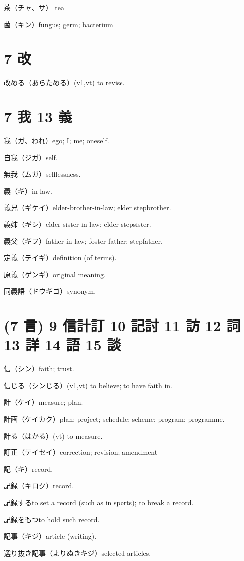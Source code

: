 茶（チャ、サ） tea

菌（キン）fungus; germ; bacterium

\section{7 改}

改める（あらためる）(v1,vt) to revise.

\section{7 我 13 義}

我（ガ、われ）ego; I; me; oneself.

自我（ジガ）self.

無我（ムガ）selflessness.

義（ギ）in-law.

義兄（ギケイ）elder-brother-in-law; elder stepbrother.

義姉（ギシ）elder-sister-in-law; elder stepsister.

義父（ギフ）father-in-law; foster father; stepfather.

定義（テイギ）definition (of terms).

原義（ゲンギ）original meaning.

同義語（ドウギゴ）synonym.

\section{(7 言) 9 信計訂 10 記討 11 訪 12 詞 13 詳 14 語 15 談}

信（シン）faith; trust.

信じる（シンじる）(v1,vt) to believe; to have faith in.

計（ケイ）measure; plan.

計画（ケイカク）plan; project; schedule; scheme; program; programme.

計る（はかる）(vt) to measure.

訂正（テイセイ）correction; revision; amendment

記（キ）record.

記録（キロク）record.

記録するto set a record (such as in sports); to break a record.

記録をもつto hold such record.

記事（キジ）article (writing).

選り抜き記事（よりぬきキジ）selected articles.

